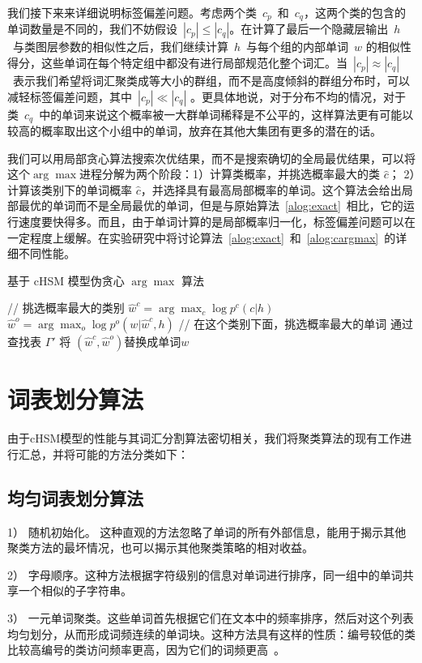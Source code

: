我们接下来来详细说明标签偏差问题。考虑两个类~$c_p$~和~$c_q$，这两个类的包含的单词数量是不同的，我们不妨假设~$|c_p|\le|c_q|$。在计算了最后一个隐藏层输出~$h$~与类图层参数的相似性之后，我们继续计算~$h$~与每个组的内部单词~$w$ 的相似性得分，这些单词在每个特定组中都没有进行局部规范化整个词汇。当~$|c_p|\approx|c_q|$~表示我们希望将词汇聚类成等大小的群组，而不是高度倾斜的群组分布时，可以减轻标签偏差问题，其中~$|c_p|\ll|c_q|$ 。更具体地说，对于分布不均的情况，对于类~$c_q$~中的单词来说这个概率被一大群单词稀释是不公平的，这样算法更有可能以较高的概率取出这个小组中的单词，放弃在其他大集团有更多的潜在的话。

我们可以用局部贪心算法搜索次优结果，而不是搜索确切的全局最优结果，可以将这个$\arg\max$进程分解为两个阶段：1）计算类概率，并挑选概率最大的类 $\hat c $； 2）计算该类别下的单词概率 $\hat c$，并选择具有最高局部概率的单词。这个算法会给出局部最优的单词而不是全局最优的单词，但是与原始算法~\ref{alog:exact}~相比，它的运行速度要快得多。而且，由于单词计算的是局部概率归一化，标签偏差问题可以在一定程度上缓解。在实验研究中将讨论算法~\ref{alog:exact}~和~\ref{alog:cargmax}~的详细不同性能。
\begin{algorithm}[!t]
 \caption{基于 cHSM 模型伪贪心 $\arg\max$ 算法}\label{alog:cargmax}
{// 挑选概率最大的类别}\;
 {$\hat w^c=\arg\max_c{\log p^c(c|h)}$ }\;
 {$\hat w^o=\arg\max_o{\log p^o(w|\hat w^c,h)}$}\;
 {// 在这个类别下面，挑选概率最大的单词}\;
 {通过查找表 $\Gamma'$ 将 $(\hat w^c,\hat w^o)$替换成单词$w$}\;
\end{algorithm}

\section{词表划分算法}
由于cHSM模型的性能与其词汇分割算法密切相关，我们将聚类算法的现有工作进行汇总，并将可能的方法分类如下：

\subsection{均匀词表划分算法}
1） 随机初始化。 这种直观的方法忽略了单词的所有外部信息，能用于揭示其他聚类方法的最坏情况，也可以揭示其他聚类策略的相对收益。

2） 字母顺序。这种方法根据字符级别的信息对单词进行排序，同一组中的单词共享一个相似的子字符串。


3） 一元单词聚类。这些单词首先根据它们在文本中的频率排序，然后对这个列表均匀划分，从而形成词频连续的单词块。这种方法具有这样的性质：编号较低的类比较高编号的类访问频率更高，因为它们的词频更高~。



